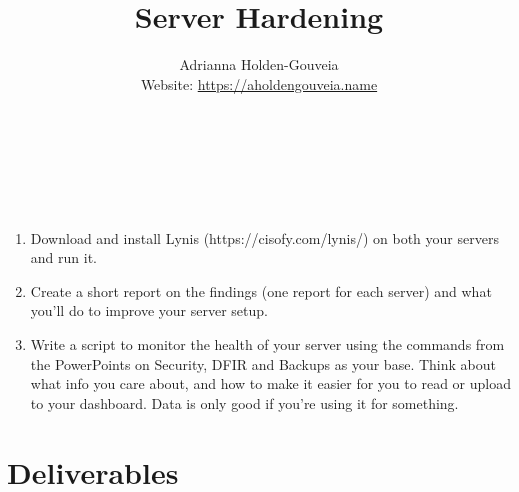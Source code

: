 \documentclass[12pt]{article}
\title{Server Hardening}
\author{
        Adrianna Holden-Gouveia \\
        Website: \url{https://aholdengouveia.name}\\ 
        \date{\vspace{-5ex}}
        \faLinkedin{: aholdengouveia} \\
        \faGithub {: aholdengouveia} \\
        \faTwitter {: aholdengouveia} \\
        }
\begin{document}
    

\maketitle


 
    \begin{enumerate}
        \item Download and install Lynis (https://cisofy.com/lynis/) on both your servers and run it.
        \item Create a short report on the findings (one report for each server) and what you'll do to improve your server setup.
        \item Write a script to monitor the health of your server using the commands from the PowerPoints on Security, DFIR and Backups as your base. Think about what info you care about, and how to make it easier for you to read or upload to your dashboard.  Data is only good if you're using it for something. 
    \end{enumerate}



\section*{Deliverables}
\end{document}

